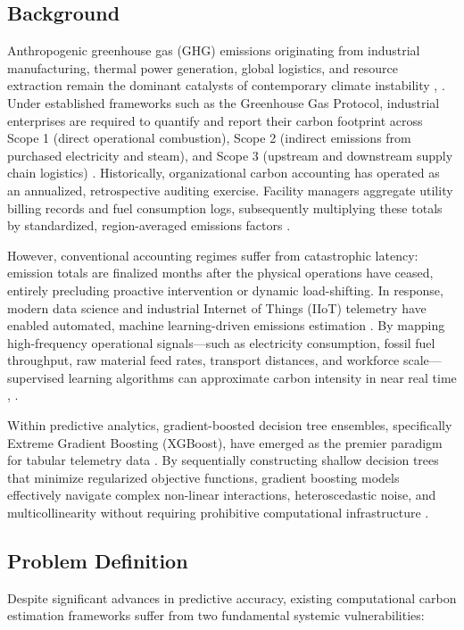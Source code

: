 \documentclass[conference]{IEEEtran}
\begin{document}
\subsection{Background}
Anthropogenic greenhouse gas (GHG) emissions originating from industrial manufacturing, thermal power generation, global logistics, and resource extraction remain the dominant catalysts of contemporary climate instability \cite{ghgprotocol2004}, \cite{ritchie2020co2}. Under established frameworks such as the Greenhouse Gas Protocol, industrial enterprises are required to quantify and report their carbon footprint across Scope 1 (direct operational combustion), Scope 2 (indirect emissions from purchased electricity and steam), and Scope 3 (upstream and downstream supply chain logistics) \cite{ghgprotocol2004}. Historically, organizational carbon accounting has operated as an annualized, retrospective auditing exercise. Facility managers aggregate utility billing records and fuel consumption logs, subsequently multiplying these totals by standardized, region-averaged emissions factors \cite{liu2022survey}.

However, conventional accounting regimes suffer from catastrophic latency: emission totals are finalized months after the physical operations have ceased, entirely precluding proactive intervention or dynamic load-shifting. In response, modern data science and industrial Internet of Things (IIoT) telemetry have enabled automated, machine learning-driven emissions estimation \cite{tiwari2023cyber}. By mapping high-frequency operational signals---such as electricity consumption, fossil fuel throughput, raw material feed rates, transport distances, and workforce scale---supervised learning algorithms can approximate carbon intensity in near real time \cite{aras2022interpretable}, \cite{chen2022lca}.

Within predictive analytics, gradient-boosted decision tree ensembles, specifically Extreme Gradient Boosting (XGBoost), have emerged as the premier paradigm for tabular telemetry data \cite{chen2016xgboost}. By sequentially constructing shallow decision trees that minimize regularized objective functions, gradient boosting models effectively navigate complex non-linear interactions, heteroscedastic noise, and multicollinearity without requiring prohibitive computational infrastructure \cite{friedman2001greedy}.

\subsection{Problem Definition}
Despite significant advances in predictive accuracy, existing computational carbon estimation frameworks suffer from two fundamental systemic vulnerabilities:
\end{document}
